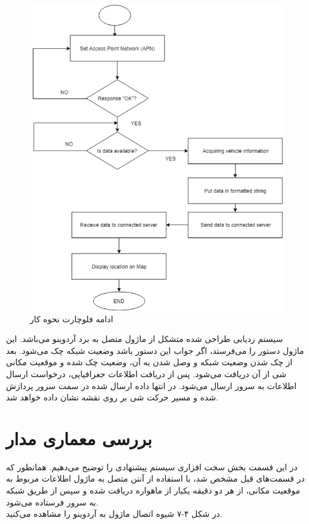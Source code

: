 \begin{figure}[!h]
	\centerline{\includegraphics[width=.9\textwidth]{continue-gsm}}
	\caption{ادامه فلوچارت نحوه کار  \cite{ElShafee2013}}
\end{figure}


سیستم ردیابی طراحی شده متشکل از ماژول  متصل به برد آردوینو می‌باشد. این ماژول دستور  را می‌فرستد، اگر جواب این دستور  باشد وضعیت شبکه چک می‌شود. بعد از چک شدن وضعیت شبکه و وصل شدن به آن، وضعیت  چک شده و موقعیت مکانی شی از آن دریافت می‌شود. پس از دریافت اطلاعات جغرافیایی، درخواست ارسال اطلاعات به سرور ارسال می‌شود. در انتها داده ارسال شده در سمت سرور پردازش شده و مسیر حرکت شی بر روی نقشه نشان داده خواهد شد.
\\
\section{بررسی معماری مدار}
در این قسمت بخش سخت‌ افزاری سیستم پیشنهادی را توضیح می‌دهیم. همانطور که در قسمت‌های قبل مشخص شد، با استفاده از آنتن  متصل به ماژول  اطلاعات مربوط به موقعیت مکانی، از هر دو دقیقه یکبار از ماهواره دریافت شده و سپس از طریق شبکه  به سرور فرستاده می‌شود. \\
در شکل ۴-۷ شیوه اتصال ماژول  به آردوینو را مشاهده می‌کنید.\\

